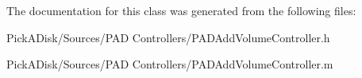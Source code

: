 The documentation for this class was generated from the following files:\begin{DoxyCompactItemize}
\item 
PickADisk/Sources/PAD Controllers/PADAddVolumeController.h\item 
PickADisk/Sources/PAD Controllers/PADAddVolumeController.m\end{DoxyCompactItemize}
